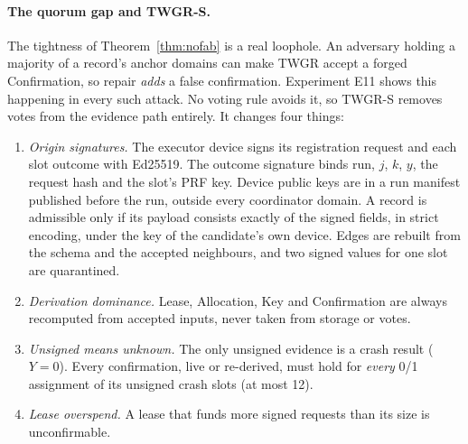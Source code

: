 \documentclass[pdflatex,sn-mathphys-num]{sn-jnl}
\theoremstyle{thmstyleone}
\theoremstyle{thmstyletwo}
\theoremstyle{thmstylethree}
\begin{document}
\paragraph{The quorum gap and TWGR-S.} The tightness of Theorem~\ref{thm:nofab} is a real loophole. An adversary holding a majority of a record's anchor domains can make TWGR accept a forged Confirmation, so repair \emph{adds} a false confirmation. Experiment E11 shows this happening in every such attack. No voting rule avoids it, so TWGR-S removes votes from the evidence path entirely. It changes four things:
\begin{enumerate}
\item \emph{Origin signatures.} The executor device signs its registration request and each slot outcome with Ed25519. The outcome signature binds run, $j$, $k$, $y$, the request hash and the slot's PRF key. Device public keys are in a run manifest published before the run, outside every coordinator domain. A record is admissible only if its payload consists exactly of the signed fields, in strict encoding, under the key of the candidate's own device. Edges are rebuilt from the schema and the accepted neighbours, and two signed values for one slot are quarantined.
\item \emph{Derivation dominance.} Lease, Allocation, Key and Confirmation are always recomputed from accepted inputs, never taken from storage or votes.
\item \emph{Unsigned means unknown.} The only unsigned evidence is a crash result ($Y=0$). Every confirmation, live or re-derived, must hold for \emph{every} 0/1 assignment of its unsigned crash slots (at most 12).
\item \emph{Lease overspend.} A lease that funds more signed requests than its size is unconfirmable.
\end{enumerate}
\end{document}
